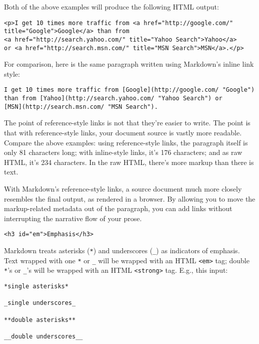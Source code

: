 Both of the above examples will produce the following HTML output:

\begin{lstlisting}
<p>I get 10 times more traffic from <a href="http://google.com/"
title="Google">Google</a> than from
<a href="http://search.yahoo.com/" title="Yahoo Search">Yahoo</a>
or <a href="http://search.msn.com/" title="MSN Search">MSN</a>.</p>
\end{lstlisting}




For comparison, here is the same paragraph written using
Markdown's inline link style:

\begin{lstlisting}
I get 10 times more traffic from [Google](http://google.com/ "Google")
than from [Yahoo](http://search.yahoo.com/ "Yahoo Search") or
[MSN](http://search.msn.com/ "MSN Search").
\end{lstlisting}




The point of reference-style links is not that they're easier to
write. The point is that with reference-style links, your document
source is vastly more readable. Compare the above examples: using
reference-style links, the paragraph itself is only 81 characters
long; with inline-style links, it's 176 characters; and as raw HTML,
it's 234 characters. In the raw HTML, there's more markup than there
is text.



With Markdown's reference-style links, a source document much more
closely resembles the final output, as rendered in a browser. By
allowing you to move the markup-related metadata out of the paragraph,
you can add links without interrupting the narrative flow of your
prose.

\begin{lstlisting}<h3 id="em">Emphasis</h3>\end{lstlisting}




Markdown treats asterisks (\texttt{*}) and underscores (\texttt{\_}) as indicators of
emphasis. Text wrapped with one \texttt{*} or \texttt{\_} will be wrapped with an
HTML \texttt{<em>} tag; double \texttt{*}'s or \texttt{\_}'s will be wrapped with an HTML
\texttt{<strong>} tag. E.g., this input:

\begin{lstlisting}
*single asterisks*

_single underscores_

**double asterisks**

__double underscores__
\end{lstlisting}




